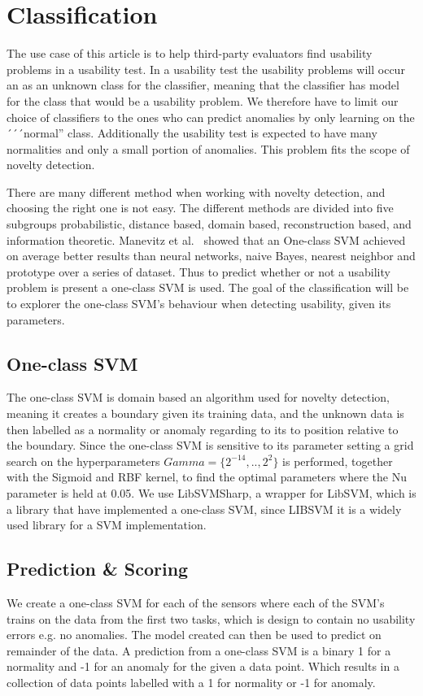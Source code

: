 \section{Classification}
The use case of this article is to help third-party evaluators find usability problems in a usability test.
In a usability test the usability problems will occur an as an unknown class for the classifier, meaning that the classifier has model for the class that would be a usability problem. 
We therefore have to limit our choice of classifiers to the ones who can predict anomalies by only learning on the ´´´normal'' class.
Additionally the usability test is expected to have many normalities and only a small portion of anomalies.
This problem fits the scope of novelty detection\cite{noveltyDetection}.

There are many different method when working with novelty detection\cite{noveltyDetection}, and choosing the right one is not easy.
The different methods are divided into five subgroups probabilistic, distance based, domain based, reconstruction based, and information theoretic.
Manevitz et al.~\cite{oneClassSVM} showed that an One-class SVM achieved on average better results than neural networks, naive Bayes, nearest neighbor and prototype over a series of dataset.
Thus to predict whether or not a usability problem is present a one-class SVM is used.
The goal of the classification will be to explorer the one-class SVM's behaviour when detecting usability, given its parameters.

\subsection{One-class SVM}
The one-class SVM is domain based an algorithm used for novelty detection, meaning it creates a boundary given its training data, and the unknown data is then labelled as a normality or anomaly regarding to its to position relative to the boundary.
Since the one-class SVM is sensitive\cite{oneClassSVM} to its parameter setting a grid search on the hyperparameters $Gamma = \{2^{-14},..,2^2\}$ is performed, together with the Sigmoid and RBF kernel, to find the optimal parameters where the Nu parameter is held at 0.05.
We use LibSVMSharp\cite{libsvmsharp}, a wrapper for LibSVM\cite{libsvm}, which is a library that have implemented a one-class SVM, since LIBSVM it is a widely used library for a SVM implementation.

\subsection{Prediction \& Scoring}
We create a one-class SVM for each of the sensors where each of the SVM's trains on the data from the first two tasks, which is design to contain no usability errors e.g. no anomalies. The model created can then be used to predict on remainder of the data.
A prediction from a one-class SVM is a binary 1 for a normality and -1 for an anomaly for the given a data point.
Which results in a collection of data points labelled with a 1 for normality or -1 for anomaly.

